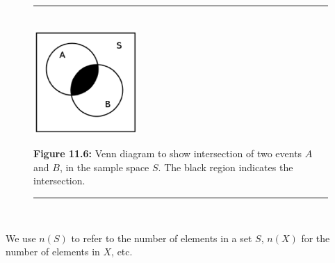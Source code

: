 	\begin{figure}[H] %
    \begin{center}
    \rule[.1in]{\figurerulewidth}{.005in} \\
        \label{m39377*uid1381!!!underscore!!!media}\label{m39377*uid1381!!!underscore!!!printimage}\includegraphics[width=150px]{col11306.imgs/m39377_intersect.png} %
      \vspace{2pt}
    \vspace{\rubberspace}\par \begin{cnxcaption}
	  \small \textbf{Figure 11.6: }Venn diagram to show intersection of two events
$A$ and \begin{math}B\end{math}, in the sample space \begin{math}S\end{math}. The black region indicates the
intersection.
	\end{cnxcaption}
    \vspace{.1in}
    \rule[.1in]{\figurerulewidth}{.005in} \\
    \end{center}
 \end{figure}       
\label{m39377*eip-805}We use $n\left(S\right)$ to refer to the number of elements in a set \begin{math}S\end{math}, \begin{math}n\left(X\right)\end{math} for the number of elements in \begin{math}X\end{math}, etc.\par \label{m39377*secfhsst!!!underscore!!!id141}\vspace{.5cm} 
      \noindent
